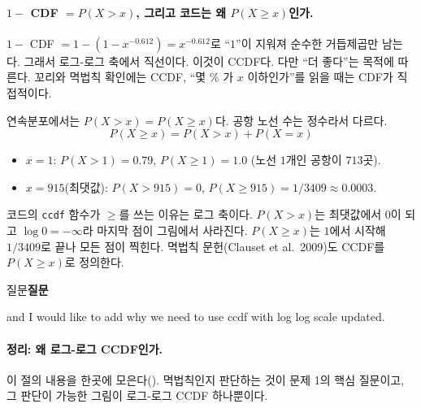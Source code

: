 \documentclass[11pt]{article}
\newenvironment{callout}[1][]
  {\par\medskip\noindent
   \begin{lrbox}{\calloutbox}\begin{minipage}{0.92\linewidth}
   \def\calloutttl{#1}\ifx\calloutttl\empty\else\textbf{#1}\par\smallskip\fi}
  {\end{minipage}\end{lrbox}%
   \fcolorbox{black!30}{black!3}{\usebox{\calloutbox}}\par\medskip}
\begin{document}
\paragraph{$1 -$ CDF $= P(X > x)$, 그리고 코드는 왜 $P(X \ge x)$인가.}
$1 -$ CDF $= 1 - (1 - x^{-0.612}) = x^{-0.612}$로 ``$1$''이 지워져 순수한 거듭제곱만
남는다. 그래서 로그-로그 축에서 직선이다. 이것이 CCDF다. 다만 ``더 좋다''는 목적에 따른다.
꼬리와 멱법칙 확인에는 CCDF, ``몇 \% 가 $x$ 이하인가''를 읽을 때는 CDF가 직접적이다.

연속분포에서는 $P(X > x) = P(X \ge x)$다. 공항 노선 수는 정수라서 다르다.
\[
  P(X \ge x) = P(X > x) + P(X = x)
\]
\begin{itemize}
  \item $x = 1$: $P(X > 1) = 0.79$, $P(X \ge 1) = 1.0$ (노선 $1$개인 공항이 $713$곳).
  \item $x = 915$(최댓값): $P(X > 915) = 0$, $P(X \ge 915) = 1/3409 \approx 0.0003$.
\end{itemize}
코드의 \texttt{ccdf} 함수가 $\ge$를 쓰는 이유는 로그 축이다. $P(X > x)$는 최댓값에서
$0$이 되고 $\log 0 = -\infty$라 마지막 점이 그림에서 사라진다. $P(X \ge x)$는 $1$에서
시작해 $1/3409$로 끝나 모든 점이 찍힌다. 멱법칙 문헌(Clauset et al.\ 2009)도 CCDF를
$P(X \ge x)$로 정의한다.

\begin{callout}[질문]
and I would like to add why we need to use ccdf with log log scale updated.
\end{callout}

\paragraph{정리: 왜 로그-로그 CCDF인가.} 이 절의 내용을 한곳에 모은다().
멱법칙인지 판단하는 것이 문제 1의 핵심 질문이고, 그 판단이 가능한 그림이 로그-로그
CCDF 하나뿐이다.
\end{document}
